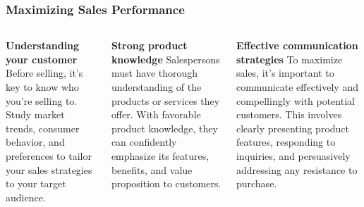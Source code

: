 \documentclass[5pt]{beamer}
\begin{document}
\begin{frame}
\frametitle{Maximizing Sales Performance}
\begin{columns}
\begin{column}{0.3\textwidth}
\begin{block}{\textbf{Understanding your customer}}
Before selling, it's key to know who you're selling to. Study market trends, consumer behavior, and preferences to tailor your sales strategies to your target audience.
\end{block}
\end{column}
\begin{column}{0.3\textwidth}
\begin{block}{\textbf{Strong product knowledge}}
Salespersons must have thorough understanding of the products or services they offer. With favorable product knowledge, they can confidently emphasize its features, benefits, and value proposition to customers.
\end{block}
\end{column}
\begin{column}{0.3\textwidth}
\begin{block}{\textbf{Effective communication strategies}}
To maximize sales, it's important to communicate effectively and compellingly with potential customers. This involves clearly presenting product features, responding to inquiries, and persuasively addressing any resistance to purchase.
\end{block}
\end{column}
\end{columns}
\end{frame}
\end{document}
